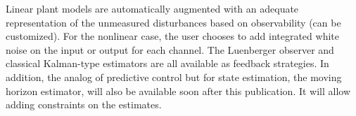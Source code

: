 Linear plant models are automatically augmented with an adequate representation of the unmeasured disturbances based on observability (can be customized). For the nonlinear case, the user chooses to add integrated white noise on the input or output for each channel. The Luenberger observer and classical Kalman-type estimators are all available as feedback strategies. In addition, the analog of predictive control but for state estimation, the moving horizon estimator, will also be available soon after this publication. It will allow adding constraints on the estimates.